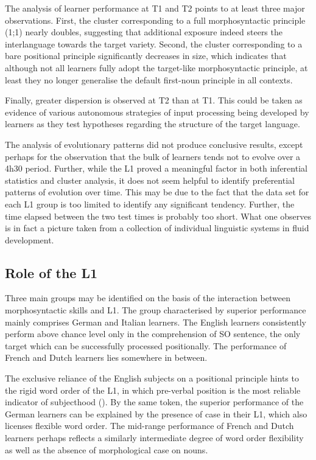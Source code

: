 The analysis of learner performance at T1 and T2 points to at least three major observations. First, the cluster corresponding to a full morphosyntactic principle (1;1) nearly doubles, suggesting that additional exposure indeed steers the interlanguage towards the target variety. Second, the cluster corresponding to a bare positional principle significantly decreases in size, which indicates that although not all learners fully adopt the target-like morphosyntactic principle, at least they no longer generalise the default first-noun principle in all contexts.

Finally, greater dispersion is observed at T2 than at T1. This could be taken as evidence of various autonomous strategies of input processing being developed by learners as they test hypotheses regarding the structure of the target language.

The analysis of evolutionary patterns did not produce conclusive results, except perhaps for the observation that the bulk of learners tends not to evolve over a 4h30 period. Further, while the L1 proved a meaningful factor in both inferential statistics and cluster analysis, it does not seem helpful to identify preferential patterns of evolution over time. This may be due to the fact that the data set for each L1 group is too limited to identify any significant tendency. Further, the time elapsed between the two test times is probably too short. What one observes is in fact a picture taken from a collection of individual linguistic systems in fluid development. 

\subsection{Role of the L1}\label{sec:08:4.5}

Three main groups may be identified on the basis of the interaction between morphosyntactic skills and L1. The group characterised by superior performance mainly comprises German and Italian learners. The English learners consistently perform above chance level only in the comprehension of SO sentence, the only target which can be successfully processed positionally. The performance of French and Dutch learners lies somewhere in between. 

The exclusive reliance of the English subjects on a positional principle hints to the rigid word order of the L1, in which pre-verbal position is the most reliable indicator of subjecthood (\citealt{MacWhinneyEtAl1984}). By the same token, the superior performance of the German learners can be explained by the presence of case in their L1, which also licenses flexible word order. The mid-range performance of French and Dutch learners perhaps reflects a similarly intermediate degree of word order flexibility as well as the absence of morphological case on nouns. 

